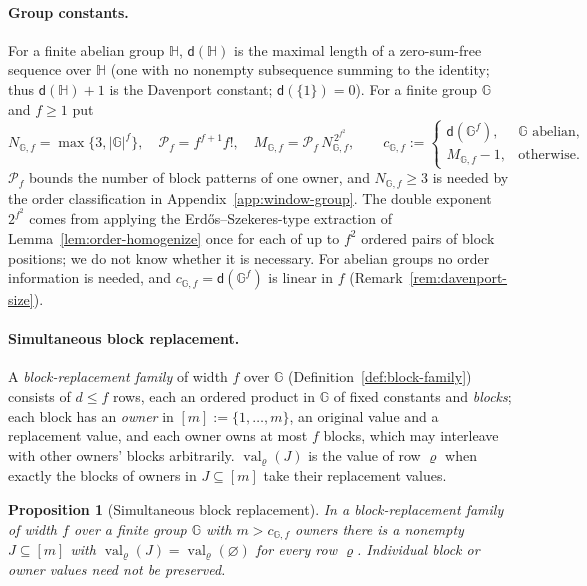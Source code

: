 \documentclass[11pt]{article}
\numberwithin{equation}{section}
\theoremstyle{plain}
\newtheorem{proposition}[theorem]{Proposition}
\theoremstyle{definition}
\theoremstyle{remark}
\begin{document}
\paragraph{Group constants.}
For a finite abelian group ${\mathbb H}$, $\mathsf d({\mathbb H})$ is the maximal length of a
zero-sum-free sequence over ${\mathbb H}$ (one with no nonempty subsequence summing
to the identity; thus $\mathsf d({\mathbb H})+1$ is the Davenport constant;
$\mathsf d(\{1\})=0$).  For a finite group ${\mathbb G}$ and $f\ge1$ put
\[
 N_{{\mathbb G},f}=\max\{3,|{\mathbb G}|^f\},\quad
 \mathcal P_f=f^{f+1}f!,\quad
 M_{{\mathbb G},f}=\mathcal P_f\,N_{{\mathbb G},f}^{\,2^{f^2}},
 \qquad
 c_{{\mathbb G},f}:=
 \begin{cases}
 \mathsf d({\mathbb G}^f),&{\mathbb G}\text{ abelian},\\
 M_{{\mathbb G},f}-1,&\text{otherwise}.
 \end{cases}
\]
$\mathcal P_f$ bounds the number of block patterns of one owner, and $N_{{\mathbb G},f}\ge3$ is
needed by the order classification in Appendix~\ref{app:window-group}.  The
double exponent $2^{f^2}$ comes from applying the Erd\H{o}s--Szekeres-type
extraction of Lemma~\ref{lem:order-homogenize} once for each of up to $f^2$
ordered pairs of block positions; we do not know whether it is necessary.
For abelian groups no order information is needed, and
$c_{{\mathbb G},f}=\mathsf d({\mathbb G}^f)$ is linear in $f$
(Remark~\ref{rem:davenport-size}).

\paragraph{Simultaneous block replacement.}
A \emph{block-replacement family} of width $f$ over ${\mathbb G}$
(Definition~\ref{def:block-family}) consists of $d\le f$ rows, each an ordered
product in ${\mathbb G}$ of fixed constants and \emph{blocks}; each block has an
\emph{owner} in $[m]:=\{1,\ldots,m\}$, an original value and a replacement value, and each owner
owns at most $f$ blocks, which may interleave with other owners' blocks
arbitrarily.  $\operatorname{val}_\varrho(J)$ is the value of row $\varrho$ when exactly the
blocks of owners in $J\subseteq[m]$ take their replacement values.

\begin{proposition}[Simultaneous block replacement]
\label{prop:block-replacement-interface}
In a block-replacement family of width $f$ over a finite group ${\mathbb G}$ with
$m>c_{{\mathbb G},f}$ owners there is a nonempty $J\subseteq[m]$ with
$\operatorname{val}_\varrho(J)=\operatorname{val}_\varrho(\varnothing)$ for every row $\varrho$.
Individual block or owner values need not be preserved.
\end{proposition}
\end{document}
